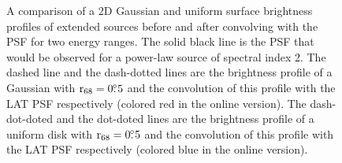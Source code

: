 \documentclass[12pt,preprint]{aastex}
\newif\ifcolorfigure
\newcommand{\rsixeight}{{\ensuremath{\text{r}_{68}}}\xspace}
\begin{document}
\clearpage
\begin{figure}
    \ifcolorfigure
      \plotone{mc_plots/compare_disk_gauss_color.eps}
    \else
    \fi
    \caption{
    A comparison of a 2D Gaussian and uniform surface brightness profiles
    of extended sources before and after convolving with the PSF for two
    energy ranges.  The solid black line is the PSF that would be observed
    for a power-law source of spectral index 2. The dashed line
    and the dash-dotted lines are 
    the brightness profile of a Gaussian with $\rsixeight=0\fdg5$
    and the convolution of this profile with the LAT PSF respectively
    (colored red in the online version).
    The dash-dot-doted and the dot-doted lines are the brightness profile
    of a uniform disk with $\rsixeight=0\fdg5$ and the convolution
    of this profile with the LAT PSF respectively (colored blue in the online version).
    }\label{compare_disk_gauss}
  \end{figure}
\end{document}
